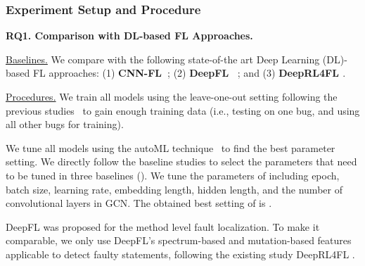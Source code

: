 \subsubsection{Experiment Setup and Procedure}
\hspace{1cm}

{\bf RQ1. Comparison with DL-based FL Approaches.}

\underline{Baselines.} We compare {\tool} with the following state-of-the art Deep Learning (DL)-based FL approaches: (1) \textbf{CNN-FL~\cite{zhang2019cnn}}; (2) {\bf DeepFL~\cite{DeepFL}} ; and (3) {\bf DeepRL4FL \cite{li2021fault}}.


\underline{Procedures.}
We train all models using the leave-one-out setting following the
previous studies~\cite{DeepFL, TraPT} to gain enough training data
(i.e., testing on one bug, and using all other bugs for
training).




We tune all models using the autoML technique~\cite{NNI} to find
the best parameter setting. We directly follow the baseline studies
to select the parameters that need to be tuned in three baselines
({\color{red}{you do not need to specify the parameters for baselines?
you let autoML to select parameters?}}). We tune the parameters of
{\tool} including epoch, batch size, learning rate, embedding length,
hidden length, and the number of convolutional layers in GCN. The
obtained best setting of {\tool} is {\color{red}{xxxxxx}}.

DeepFL was proposed for the method level fault localization. 
To make it comparable, we only use DeepFL's spectrum-based and mutation-based features applicable to detect faulty statements, following the existing study DeepRL4FL \cite{li2021fault}. 

